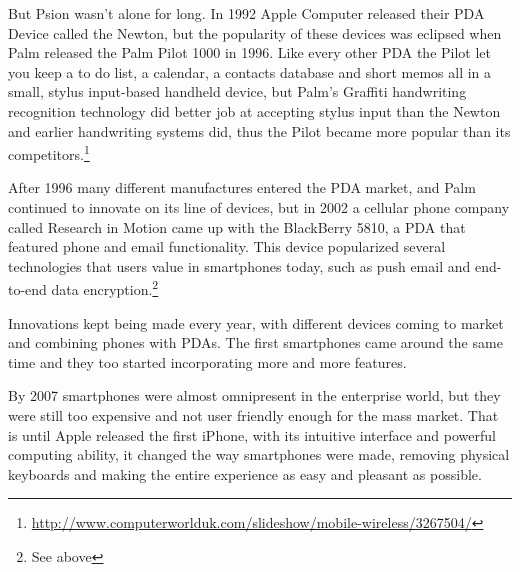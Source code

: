 But Psion wasn't alone for long. In 1992 Apple Computer released their \ac{PDA} Device called the Newton, but the popularity of these devices was eclipsed when Palm released the Palm Pilot 1000 in 1996. Like every other \ac{PDA} the Pilot let you keep a to do list, a calendar, a contacts database and short memos all in a small, stylus input-based handheld device, but Palm's Graffiti handwriting recognition technology did better job at accepting stylus input than the Newton and earlier handwriting systems did, thus the Pilot became more popular than its competitors.\footnote{\url{http://www.computerworlduk.com/slideshow/mobile-wireless/3267504/}}

After 1996 many different manufactures entered the \ac{PDA} market, and Palm continued to innovate on its line of devices, but in 2002 a cellular phone company called Research in Motion came up with the BlackBerry 5810, a \ac{PDA} that featured phone and email functionality. This device popularized several technologies that users value in smartphones today, such as push email and end-to-end data encryption.\footnote{See above}

Innovations kept being made every year, with different devices coming to market and combining phones with \ac{PDA}s. The first smartphones came around the same time and they too started incorporating more and more features.

By 2007 smartphones were almost omnipresent in the enterprise world, but they were still too expensive and not user friendly enough for the mass market. That is until Apple released the first iPhone, with its intuitive interface and powerful computing ability, it changed the way smartphones were made, removing physical keyboards and making the entire experience as easy and pleasant as possible.


